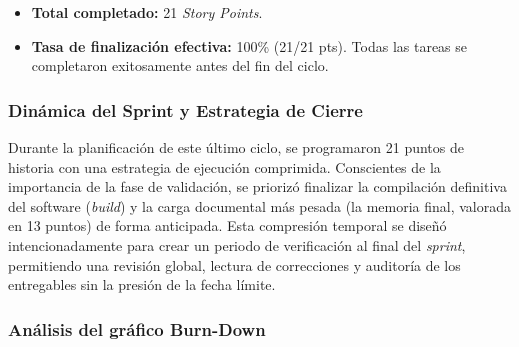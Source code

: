 \begin{table}[H]
    \centering
    \caption{Catálogo de tareas del Sprint 10.}
\end{table}
\newpage
\begin{itemize}
    \item \textbf{Total completado:} 21 \textit{Story Points}.
    \item \textbf{Tasa de finalización efectiva:} 100\% (21/21 pts). Todas las tareas se completaron exitosamente antes del fin del ciclo.
\end{itemize}

\subsubsection{Dinámica del Sprint y Estrategia de Cierre}
Durante la planificación de este último ciclo, se programaron 21 puntos de historia con una estrategia de ejecución comprimida. Conscientes de la importancia de la fase de validación, se priorizó finalizar la compilación definitiva del software (\textit{build}) y la carga documental más pesada (la memoria final, valorada en 13 puntos) de forma anticipada. Esta compresión temporal se diseñó intencionadamente para crear un periodo de verificación al final del \textit{sprint}, permitiendo una revisión global, lectura de correcciones y auditoría de los entregables sin la presión de la fecha límite.

\subsubsection{Análisis del gráfico Burn-Down}

